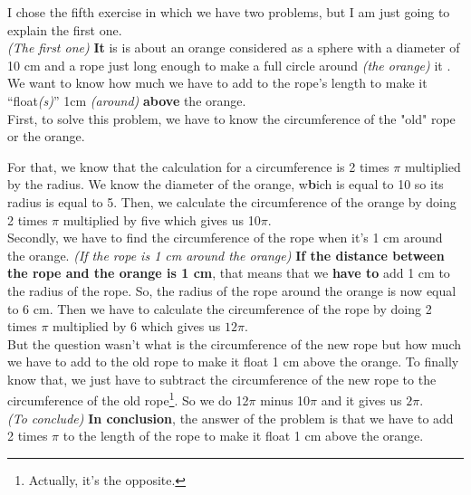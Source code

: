 \documentclass[12pt,a4paper,english,firamath]{nsi}
\begin{document}
\maketitle
I chose the fifth exercise in which we have two problems, but I am just going to explain the first one.\\
\textit{(The first one)} \textbf{It} is is about an orange considered as a sphere with a diameter of 10 cm and a rope just long enough to make a full circle around \textit{(the orange)} it . We want to know how much we have to add to the rope's length to make it “float\textit{(s)}” 1cm \textit{(around)} \textbf{above} the orange.\\

First, to solve this problem, we have to know the circumference of the "old" rope or the orange.

For that, we know that the calculation for a circumference is 2 times $\pi$ multiplied by the radius. We know the diameter of the orange, w\textbf{b}ich is equal to 10 so its radius is equal to 5.
Then, we calculate the circumference of the orange by doing 2 times $\pi$ multiplied by five which gives us 10$\pi$.\\

Secondly, we have to find the circumference of the rope when it's 1 cm around the orange. \textit{(If the rope is 1 cm around the orange)} \textbf{If the distance between the rope and the orange is 1 cm}, that means that we \textbf{have to} add 1 cm to the radius of the rope. So, the radius of the rope around the orange is now equal to 6 cm.
Then we have to calculate the circumference of the rope by doing 2 times $\pi$ multiplied by 6 which gives us $12\pi$.\\

But the question wasn't what is the circumference of the new rope but how much we have to add to the old rope to make it float 1 cm above the orange.
To finally know that, we just have to subtract the circumference of the new rope to the circumference of the old rope\footnote{Actually, it's the opposite.}. So we do 12$\pi$ minus 10$\pi$ and it gives us $2\pi$.\\

\textit{(To conclude)} \textbf{In conclusion}, the answer of the problem is that we have to add 2 times $\pi$ to the length of the rope to make it float 1 cm above the orange.
\end{document}
